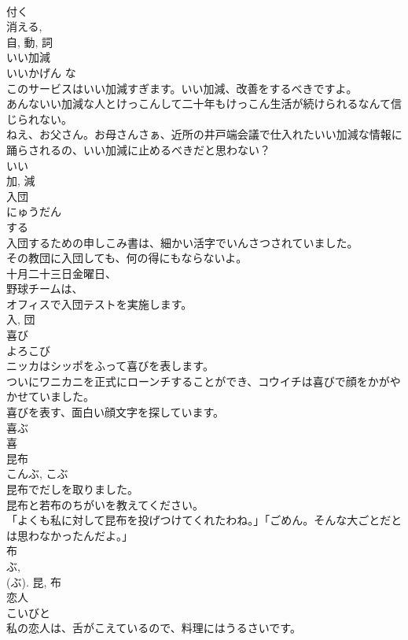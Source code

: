 \documentclass[8pt]{extreport}
\begin{document}
\begin{CJK}{UTF8}{min}
\\	付く 
\\	消える, 
\\	自, 動, 詞	
\\	いい加減	
\\	いいかげん	な 
\\	このサービスはいい加減すぎます。いい加減、改善をするべきですよ。	
\\	あんないい加減な人とけっこんして二十年もけっこん生活が続けられるなんて信じられない。	
\\	ねえ、お父さん。お母さんさぁ、近所の井戸端会議で仕入れたいい加減な情報に踊らされるの、いい加減に止めるべきだと思わない？	
\\	いい 
\\	加, 減	
\\	入団	
\\	にゅうだん	
\\	する 
\\	入団するための申しこみ書は、細かい活字でいんさつされていました。	
\\	その教団に入団しても、何の得にもならないよ。	
\\	十月二十三日金曜日、
\\	野球チームは、
\\	オフィスで入団テストを実施します。	
\\	入, 団	
\\	喜び	
\\	よろこび	
\\	ニッカはシッポをふって喜びを表します。	
\\	ついにワニカニを正式にローンチすることができ、コウイチは喜びで顔をかがやかせていました。	
\\	喜びを表す、面白い顔文字を探しています。	
\\	喜ぶ 
\\	喜	
\\	昆布	
\\	こんぶ, こぶ	
\\	昆布でだしを取りました。	
\\	昆布と若布のちがいを教えてください。	
\\	「よくも私に対して昆布を投げつけてくれたわね。」「ごめん。そんな大ごとだとは思わなかったんだよ。」	
\\	布 
\\	ぶ, 
\\	(ぶ).	昆, 布	
\\	恋人	
\\	こいびと	
\\	私の恋人は、舌がこえているので、料理にはうるさいです。	

\end{CJK}
\end{document}
